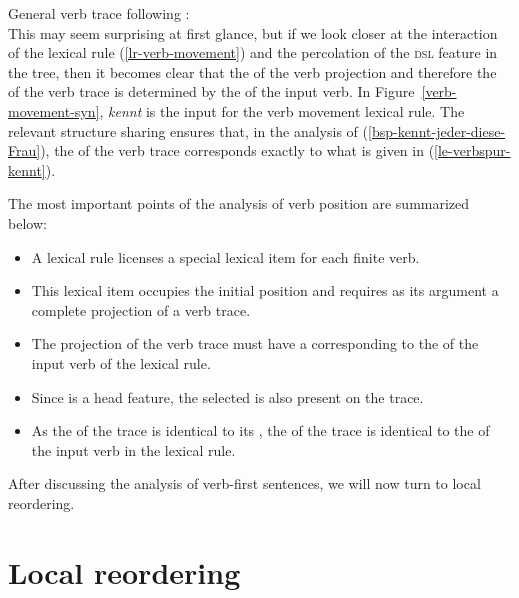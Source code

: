\eas
General verb trace following :\\
\label{le-verbspur}
\zs
This may seem surprising at first glance, but if we look closer at the interaction of the lexical rule (\ref{lr-verb-movement}) and the percolation of the
\textsc{dsl} feature in the tree, then it becomes clear that the \dslv of the verb projection and therefore the \localv of the verb trace is determined by the \localv
of the input verb. In Figure~\ref{verb-movement-syn}, \emph{kennt} is the input for the verb
movement lexical rule. The relevant structure sharing ensures that, in
the analysis of (\ref{bsp-kennt-jeder-diese-Frau}), the \localv of the verb trace corresponds exactly to what is given in (\ref{le-verbspur-kennt}).

The most important points of the analysis of verb position are summarized below:
\begin{itemize}
\item A lexical rule licenses a special lexical item for each finite verb.
\item This lexical item occupies the initial position and requires as its argument a complete projection of a verb trace.
\item The projection of the verb trace must have a \dslv corresponding to the \localv of the input verb of the lexical rule.
\item Since \dsl is a head feature, the selected \dslv is also present on the trace.
\item As the \dslv of the trace is identical to its \localv, the \localv of the trace is identical to the \localv of the input verb in the
lexical rule.
\end{itemize}

\noindent
After discussing the analysis of verb-first sentences, we will now turn to local reordering.

\section{Local reordering}
\label{sec-HPSG-lokale-Umstellung}
\label{Abschnitt-HPSG-lokale-Umstellung}

